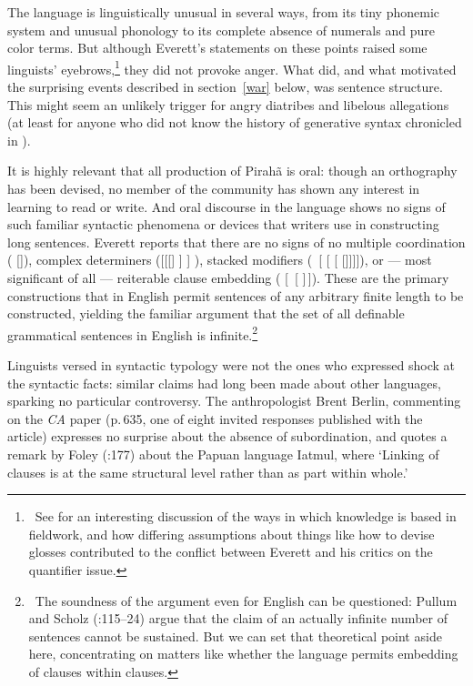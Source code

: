 \documentclass[output=paper,colorlinks,citecolor=brown
]{langscibook}
\begin{document}
The language is linguistically unusual in several ways, from its tiny
phonemic system and unusual phonology to its complete absence of
numerals and pure color terms. But although Everett's statements on
these points raised some linguists' eyebrows,\footnote{\,
   See \citealt{DobrSchw21} for an interesting discussion of the ways
   in which knowledge is based in fieldwork, and how differing assumptions
   about things like how to devise glosses contributed to the conflict
   between Everett and his critics on the quantifier issue.}
they did not provoke anger. What did, and what motivated the surprising
events described in section~\ref{war} below, was sentence structure.
This might seem an unlikely trigger for angry diatribes and libelous
allegations (at least for anyone who did not know the history of
generative syntax chronicled in \citealt{Harris21}).

It is highly relevant that all production of Pirah{\~a} is oral:
though an orthography has been devised, no member of the community
has shown any interest in learning to read or write. And oral
discourse in the language shows no signs of such familiar syntactic
phenomena or devices that writers use in constructing long sentences.
Everett reports that there are no signs of no multiple coordination
( []),
complex determiners ([[[] ] ]
), stacked modifiers (~[ [
[ []]]]), or --- most significant
of all --- reiterable clause embedding ( [\, [\,\,]\,]). These are the primary
constructions that in English permit sentences of any arbitrary finite
length to be constructed, yielding the familiar argument that the set
of all definable grammatical sentences in English is
infinite.\footnote{\,
   The soundness of the argument even for English can be questioned:
   Pullum and Scholz (\citeyear{PullScho10}:115--24) argue that the
   claim of an actually infinite number of sentences cannot be
   sustained. But we can set that theoretical point aside here,
   concentrating on matters like whether the language permits
   embedding of clauses within clauses.}

Linguists versed in syntactic typology were not the ones who expressed
shock at the syntactic facts: similar claims had long been made about
other languages, sparking no particular controversy. The anthropologist
Brent Berlin, commenting on the \textit{CA} paper (p.\,635, one of
eight invited responses published with the article) expresses no
surprise about the absence of subordination, and quotes a remark by
Foley (\citeyear{Foley86}:177) about the Papuan language Iatmul, where
`Linking of clauses is at the same structural level rather than as
part within whole.'
\end{document}
